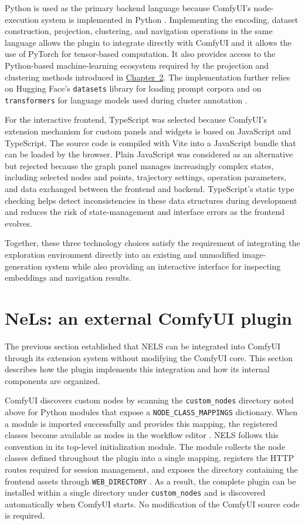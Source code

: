 Python is used as the primary backend language because ComfyUI's node-execution system is implemented in Python \cite{comfyorg2026walkthrough}. Implementing the encoding, dataset construction, projection, clustering, and navigation operations in the same language allows the plugin to integrate directly with ComfyUI and it allows the use of PyTorch for tensor-based computation. It also provides access to the Python-based machine-learning ecosystem required by the projection and clustering methods introduced in \hyperref[ch:foundations]{Chapter~2}. The implementation further relies on Hugging Face's \texttt{datasets} library for loading prompt corpora and on \texttt{transformers} for language models used during cluster annotation \cite{huggingface2026datasets,huggingface2026transformers}.

For the interactive frontend, TypeScript was selected because ComfyUI's extension mechanism for custom panels and widgets is based on JavaScript and TypeScript. The source code is compiled with Vite into a JavaScript bundle that can be loaded by the browser.
Plain JavaScript was considered as an alternative but rejected because the graph panel manages increasingly complex states, including selected nodes and points, trajectory settings, operation parameters, and data exchanged between the frontend and backend. TypeScript's static type checking helps detect inconsistencies in these data structures during development and reduces the risk of state-management and interface errors as the frontend evolves.

Together, these three technology choices satisfy the requirement of integrating the exploration environment directly into an existing and unmodified image-generation system while also providing an interactive interface for inspecting embeddings and navigation results.

\section{NeLs: an external ComfyUI plugin}\label{sec:4.3}

The previous section established that NELS can be integrated into ComfyUI through its extension system without modifying the ComfyUI core. This section describes how the plugin implements this integration and how its internal components are organized.

ComfyUI discovers custom nodes by scanning the \texttt{custom\_nodes} directory noted above for Python modules that expose a \texttt{NODE\_CLASS\_MAPPINGS} dictionary. When a module is imported successfully and provides this mapping, the registered classes become available as nodes in the workflow editor \cite{comfyorg2026lifecycle}. NELS follows this convention in its top-level initialization module. The module collects the node classes defined throughout the plugin into a single mapping, registers the HTTP routes required for session management, and exposes the directory containing the frontend assets through \texttt{WEB\_DIRECTORY} \cite{comfyorg2026lifecycle}.
As a result, the complete plugin can be installed within a single directory under \texttt{custom\_nodes} and is discovered automatically when ComfyUI starts. No modification of the ComfyUI source code is required.

